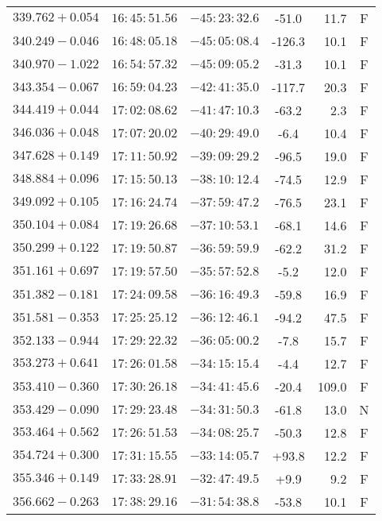 {\begin{longtable}{lcccrc}
	$339.762+0.054  $&    $16:45:51.56$ &   $-45:23:32.6$  &  -51.0&   11.7&  F  \\
	$340.249-0.046  $&    $16:48:05.18$ &   $-45:05:08.4$  & -126.3&   10.1&  F  \\
	$340.970-1.022  $&    $16:54:57.32$ &   $-45:09:05.2$  &  -31.3&   10.1&  F  \\
	$343.354-0.067  $&    $16:59:04.23$ &   $-42:41:35.0$  & -117.7&   20.3&  F  \\
	$344.419+0.044  $&    $17:02:08.62$ &   $-41:47:10.3$  &  -63.2&    2.3&  F  \\
	$346.036+0.048  $&    $17:07:20.02$ &   $-40:29:49.0$  &   -6.4&   10.4&  F  \\
	$347.628+0.149  $&    $17:11:50.92$ &   $-39:09:29.2$  &  -96.5&   19.0&  F  \\
	$348.884+0.096  $&    $17:15:50.13$ &   $-38:10:12.4$  &  -74.5&   12.9&  F  \\
	$349.092+0.105  $&    $17:16:24.74$ &   $-37:59:47.2$  &  -76.5&   23.1&  F  \\
	$350.104+0.084  $&    $17:19:26.68$ &   $-37:10:53.1$  &  -68.1&   14.6&  F  \\
	$350.299+0.122  $&    $17:19:50.87$ &   $-36:59:59.9$  &  -62.2&   31.2&  F  \\
	$351.161+0.697  $&    $17:19:57.50$ &   $-35:57:52.8$  &   -5.2&   12.0&  F  \\
	$351.382-0.181  $&    $17:24:09.58$ &   $-36:16:49.3$  &  -59.8&   16.9&  F  \\
	$351.581-0.353  $&    $17:25:25.12$ &   $-36:12:46.1$  &  -94.2&   47.5&  F  \\
	$352.133-0.944  $&    $17:29:22.32$ &   $-36:05:00.2$  &   -7.8&   15.7&  F  \\
	$353.273+0.641  $&    $17:26:01.58$ &   $-34:15:15.4$  &   -4.4&   12.7&  F  \\
	$353.410-0.360  $&    $17:30:26.18$ &   $-34:41:45.6$  &  -20.4&  109.0&  F  \\
	$353.429-0.090  $&    $17:29:23.48$ &   $-34:31:50.3$  &  -61.8&   13.0&  N  \\
	$353.464+0.562  $&    $17:26:51.53$ &   $-34:08:25.7$  &  -50.3&   12.8&  F  \\
	$354.724+0.300  $&    $17:31:15.55$ &   $-33:14:05.7$  &  +93.8&   12.2&  F  \\
	$355.346+0.149  $&    $17:33:28.91$ &   $-32:47:49.5$  &   +9.9&    9.2&  F  \\
	$356.662-0.263  $&    $17:38:29.16$ &   $-31:54:38.8$  &  -53.8&   10.1&  F  \\

\end{longtable}}
